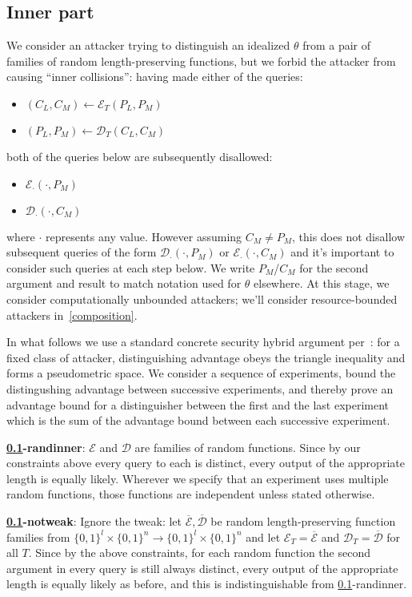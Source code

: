 \documentclass[journal=tosc,preprint,floatrow,submission]{iacrtrans}
\newcommand*{\xprm}[2]{\textsf{\ref*{#1}-#2}}
\newcommand*{\xprmtitle}[2]{\textbf{\xprm{#1}{#2}}}
\newcommand*{\calE}{\mathcal{E}}
\newcommand*{\calD}{\mathcal{D}}
\newcommand*{\barE}{\overline{\calE}}
\newcommand*{\barD}{\overline{\calD}}
\begin{document}
\subsection{Inner part}\label{innerpart}

We consider an attacker trying to distinguish an idealized $\theta$ from a
pair of families of random length-preserving functions,
but we forbid the attacker from causing ``inner collisions'':
having made either of the queries: \label{constraints}
\begin{itemize}
    \item $(C_L, C_M) \leftarrow \calE_T(P_L, P_M)$
    \item $(P_L, P_M) \leftarrow \calD_T(C_L, C_M)$
\end{itemize}
both of the queries below are subsequently disallowed:
\begin{itemize}
    \item $\calE_\cdotp(\cdotp, P_M)$
    \item $\calD_\cdotp(\cdotp, C_M)$
\end{itemize}
where $\cdotp$ represents any value. However assuming $C_M \neq P_M$, this does not disallow
subsequent queries of the form $\calD_\cdotp(\cdotp, P_M)$ or $\calE_\cdotp(\cdotp, C_M)$
and it's important to consider such queries at each step below. We write
$P_M$/$C_M$ for the second argument and result to match notation used for $\theta$ elsewhere.
At this stage, we consider computationally unbounded attackers; we'll consider resource-bounded
attackers in~\autoref{composition}.

In what follows we use a standard concrete security hybrid argument per~\cite{concrete,games}:
for a fixed class of attacker, distinguishing advantage obeys the triangle inequality and
forms a pseudometric space. We consider a
sequence of experiments, bound the distingushing advantage between successive
experiments, and thereby
prove an advantage bound for a distinguisher between the first and the last experiment
which is the sum of the advantage bound between each successive experiment.

\xprmtitle{innerpart}{randinner}: $\calE$ and $\calD$ are families of
random functions. Since by our constraints above every query to each
is distinct, every output of the
appropriate length is equally likely. Wherever we specify that an experiment uses multiple random
functions, those functions are independent unless stated otherwise.

\xprmtitle{innerpart}{notweak}: Ignore the tweak: let
$\barE, \barD$ be random length-preserving function families from
$\{0,1\}^l \times \{0,1\}^n \rightarrow \{0,1\}^l \times \{0,1\}^n$
and let $\calE_T = \barE$ and $\calD_T = \barD$ for all $T$.
Since by the above constraints, for each random function the second argument in every query
is still always distinct, every output of the appropriate length is equally
likely as before, and this is indistinguishable from \xprm{innerpart}{randinner}.
\end{document}
